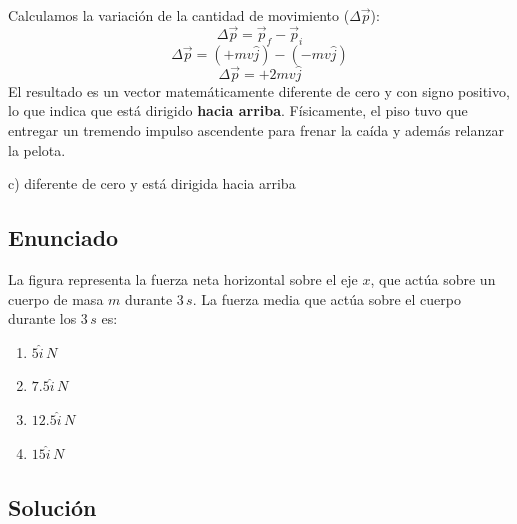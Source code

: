 \documentclass[12pt, a4paper]{article}
\begin{document}
Calculamos la variación de la cantidad de movimiento ($\Delta\vec{p}$):
$$ \Delta\vec{p} = \vec{p}_f - \vec{p}_i $$
$$ \Delta\vec{p} = (+mv\hat{j}) - (-mv\hat{j}) $$
$$ \Delta\vec{p} = +2mv\hat{j} $$
El resultado es un vector matemáticamente diferente de cero y con signo positivo, lo que indica que está dirigido \textbf{hacia arriba}. Físicamente, el piso tuvo que entregar un tremendo impulso ascendente para frenar la caída y además relanzar la pelota.

\begin{tcolorbox}[colback=green!5!white, colframe=green!50!black, title=Respuesta Final]
\centering \Large c) diferente de cero y está dirigida hacia arriba
\end{tcolorbox}

\newpage

\subsection*{Enunciado}
La figura representa la fuerza neta horizontal sobre el eje $x$, que actúa sobre un cuerpo de masa $m$ durante $3\,\si{s}$. La fuerza media que actúa sobre el cuerpo durante los $3\,\si{s}$ es:

\begin{center}
\end{center}

\begin{enumerate}[label=\alph*)]
    \item $5\hat{i}\,\si{N}$
    \item $7.5\hat{i}\,\si{N}$
    \item $12.5\hat{i}\,\si{N}$
    \item $15\hat{i}\,\si{N}$
\end{enumerate}

\subsection*{Solución}
\end{document}
